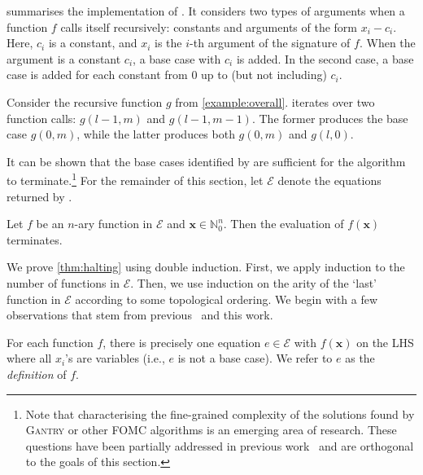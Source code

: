 \documentclass[a4paper,UKenglish,cleveref, autoref, thm-restate]{lipics-v2021}
\newcommand{\Cranetwo}{\textsc{Gantry}}
\begin{document}
 summarises the implementation of \FindBaseCases. It
considers two types of arguments when a function $f$ calls itself recursively:
constants and arguments of the form $x_{i} - c_{i}$. Here, $c_{i}$ is a
constant, and $x_{i}$ is the $i$-th argument of the signature of $f$. When the
argument is a constant $c_{i}$, a base case with $c_{i}$ is added. In the second
case, a base case is added for each constant from $0$ up to (but not including)
$c_{i}$.

\begin{example}
  Consider the recursive function $g$ from \cref{example:overall}.
  \FindBaseCases iterates over two function calls: $g(l-1, m)$ and
  $g(l-1, m-1)$. The former produces the base case $g(0, m)$, while the latter
  produces both $g(0, m)$ and $g(l, 0)$.
\end{example}

It can be shown that the base cases identified by \FindBaseCases are sufficient
for the algorithm to terminate.\footnote{Note that characterising the
  fine-grained complexity of the solutions found by \Cranetwo{} or other FOMC
  algorithms is an emerging area of research. These questions have been
  partially addressed in previous
  work~\cite{DBLP:conf/kr/DilkasB23,tóth2024complexityweightedfirstordermodel}
  and are orthogonal to the goals of this section.} For the remainder of this
section, let $\mathcal{E}$ denote the equations returned by
\CompileWithBaseCases.

\begin{theorem}[Termination]\label{thm:halting}
  Let $f$ be an $n$-ary function in $\mathcal{E}$ and
  $\mathbf{x} \in \mathbb{N}_{0}^{n}$. Then the evaluation of $f(\mathbf{x})$
  terminates.
\end{theorem}

We prove \cref{thm:halting} using double induction. First, we apply induction to
the number of functions in $\mathcal{E}$. Then, we use induction on the arity of
the `last' function in $\mathcal{E}$ according to some topological ordering. We
begin with a few observations that stem from
previous~\cite{DBLP:conf/kr/DilkasB23,DBLP:conf/ijcai/BroeckTMDR11} and this
work.

\begin{observation}\label{assumption1}
  For each function $f$, there is precisely one equation $e \in \mathcal{E}$
  with $f(\mathbf{x})$ on the LHS where all $x_{i}$'s are variables (i.e., $e$
  is not a base case). We refer to $e$ as the \emph{definition} of $f$.
\end{observation}
\end{document}
